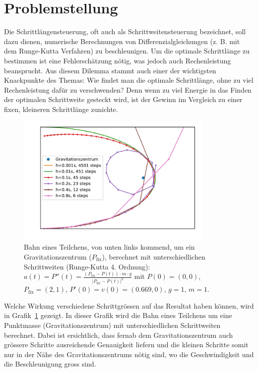 %
%
%
\section{Problemstellung
\label{steps:section:problemstellung}}
Die Schrittlängensteuerung, oft auch als Schrittweitensteuerung bezeichnet,
soll dazu dienen, numerische Berechnungen von Differenzialgleichungen (z. B. mit dem Runge-Kutta Verfahren) zu beschleunigen.
Um die optimale Schrittlänge zu bestimmen ist eine Fehlerschätzung nötig,
was jedoch auch Rechenleistung beansprucht.
Aus diesem Dilemma stammt auch einer der wichtigsten Knackpunkte des Themas:
Wie findet man die optimale Schrittlänge, ohne zu viel Rechenleistung dafür zu verschwenden?
Denn wenn zu viel Energie in das Finden der optimalen Schrittweite gesteckt wird,
ist der Gewinn im Vergleich zu einer fixen, kleineren Schrittlänge zunichte.

\begin{figure}
\centering
\includegraphics[width=0.85\textwidth]{papers/steps/img/gravity_different_fixed_stepsize.pdf}
\caption{Bahn eines Teilchens, von unten links kommend,
um ein Gravitationszentrum ($P_\text{fix}$), berechnet mit unterschiedlichen Schrittweiten (Runge-Kutta 4. Ordnung):
$a(t)=P''(t)=\frac{(P_\text{fix}-P(t))\cdot m\cdot g}{|P_\text{fix}-P(t)|^{3}}$
mit $P(0)=(0, 0)$, $P_\text{fix}=(2, 1)$, $P'(0)=v(0)=(0.669, 0)$, $g=1$, $m=1$.
\label{buch:steps:fixed_comparison}}
\end{figure}

Welche Wirkung verschiedene Schrittgrössen
auf das Resultat haben können, wird in Grafik~\ref{buch:steps:fixed_comparison} gezeigt.
In dieser Grafik wird die Bahn eines Teilchens um eine Punktmasse (Gravitationszentrum)
mit unterschiedlichen Schrittweiten berechnet.
Dabei ist ersichtlich, dass fernab dem Gravitationszentrum auch grössere Schritte
ausreichende Genauigkeit liefern und die kleinen Schritte somit nur in der Nähe des Gravitationszentrums
nötig sind, wo die Geschwindigkeit und die Beschleunigung gross sind.




